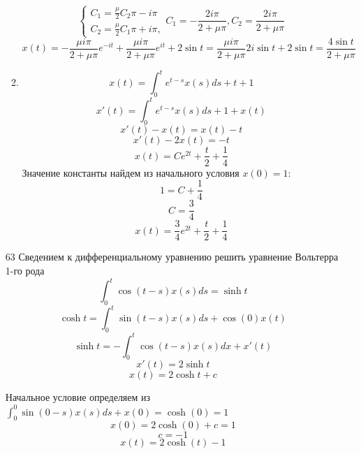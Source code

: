 \documentclass[a4paper, 12pt]{report}
\theoremstyle{definition}
\theoremstyle{remark}
\begin{document}
\begin{large}
\begin{enumerate}
\begin{enumerate}
\[\begin{cases}
            C_1 = \frac{\mu}{2} C_2 \pi -i\pi \\
            C_2 = \frac{\mu}{2} C_1 \pi +i\pi,
        \end{cases} C_1 = -\frac{2i\pi}{2 + \mu \pi}, C_2 = \frac{2i\pi}{2 + \mu \pi}\]
        \[x(t) = -\frac{\mu i\pi}{2 + \mu \pi} e^{-it} + \frac{\mu i\pi}{2 + \mu \pi} e^{it} + 2\sin t = \frac{\mu i\pi}{2 + \mu \pi}2i \sin t + 2\sin t = \frac{4\sin t}{2+\mu \pi}\]
        \item \[x(t) = \int_0^t e^{t-s} x(s) ds + t +1\]
            \[x'(t) = \int_0^t e^{t-s} x(s) ds +1 + x(t)\]
            \[x'(t)- x(t) =x(t) - t\]
            \[x'(t) - 2x(t) = -t\]
            \[x(t) = C e^{2t} +\frac{t}{2} + \frac{1}{4}\]
            Значение константы найдем из начального условия $x(0) = 1$:
            \[1 = C + \frac{1}{4}\]
            \[C = \frac{3}{4}\]
            \[x(t) = \frac{3}{4}e^{2t} +\frac{t}{2} + \frac{1}{4}\]
    \end{enumerate}
    \item[63] Сведением к дифференциальному уравнению решить уравнение Вольтерра 1-го рода
    \[\int_0^t  \cos(t - s) x(s) ds = \sinh t\]
    \[\cosh t = \int_0^t \sin(t-s)x(s) ds + \cos(0)x(t)\]
    \[\sinh t = -\int_0^t \cos(t-s)x(s) dx + x'(t)\]
    \[x'(t) = 2\sinh t\]
    \[x(t) = 2\cosh t + c\]
    
    Начальное условие определяем из $\int_0^0 \sin(0-s) x(s) ds + x(0)= \cosh(0) = 1$ 
    \[x(0) = 2\cosh(0) + c = 1\]
    \[c=-1\]
    \[x(t) = 2\cosh(t) - 1\]
    
\end{enumerate}
        
\end{large}
\end{document}

